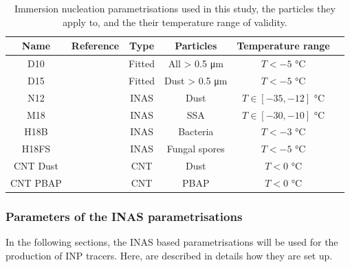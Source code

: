     \begin{table}[ht!]
        \centering
        \begin{tabular}{c|c|c|c|c|c}
        \toprule
        \textbf{Name} & \textbf{Reference}  &  \textbf{Type} & \textbf{Particles} & \textbf{Temperature range}\\
        \midrule
        D10 & \citet{demott_predicting_2010} & Fitted & All > 0.5 \si{\um} & $T<-5$ \si{\degreeCelsius} \\
        D15 & \citet{demott_integrating_2015} & Fitted & Dust > 0.5 \si{\um} & $T<-5$ \si{\degreeCelsius} \\
        N12 & \citet{niemand_particle-surface-area-based_2012} & INAS & Dust & $T\in[-35,-12]$ \si{\degreeCelsius} \\
        M18 & \citet{mccluskey_marine_2018}& INAS & SSA & $T\in[-30,-10]$ \si{\degreeCelsius} \\
        H18B & \citet{hummel_simulating_2018}& INAS & Bacteria & $T<-3$ \si{\degreeCelsius} \\
        H18FS & \citet{hummel_simulating_2018}& INAS & Fungal spores & $T<-5$ \si{\degreeCelsius} \\
        CNT Dust & \citet{keita_new_2020} & CNT & Dust & $T<0$ \si{\degreeCelsius}\\
        CNT PBAP & \citet{keita_new_2020} & CNT & PBAP & $T<0$ \si{\degreeCelsius}\\
        \bottomrule
        \end{tabular}
        \caption{Immersion nucleation parametrisations used in this study, the particles they apply to, and the their temperature range of validity.}
        \label{tab:param}
    \end{table}
    
            
    \subsubsection{Parameters of the INAS parametrisations}
    \label{sec:inas_parameters}
    In the following sections, the INAS based parametrisations will be used for the production of INP tracers. Here, are described in details how they are set up.


